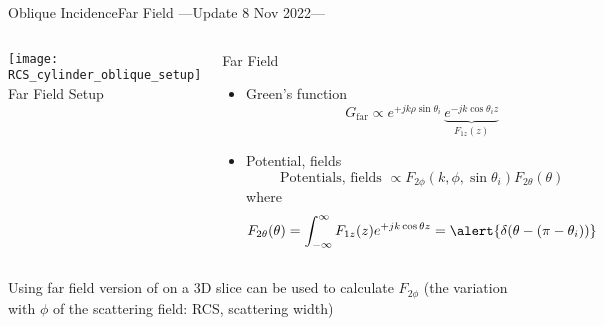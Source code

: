 
\begin{frame}[allowframebreaks]{Oblique Incidence}{Far Field
    ---{Update 8 Nov 2022}---}

  \begin{columns}
     \centering
   \texttt{[image: RCS\_cylinder\_oblique\_setup]}
    \footnotesize{Far Field Setup}

    
     \centering
   \begin{block}{Far Field }
     \begin{itemize}
     \item Green's function
       \begin{equation*}
        G_\text{far} \propto
        e^{+j k \rho \sin\theta_i}\,
        \underbrace{ e^{-j k \cos\theta_i z}}_{F_{1z}(z)}
      \end{equation*}

    \item Potential, fields
      \begin{equation*}
        \text{Potentials, fields } \propto
        F_{2\phi}(k,\phi,\sin\theta_i) F_{2\theta}(\theta)
      \end{equation*}
      where
      \begin{equation*}
        F_{2\theta}(\theta) = \int_{-\infty}^\infty F_{1z}(z)e^{+j k \cos\theta z}
        = \alert{\delta(\theta-(\pi-\theta_i))}
      \end{equation*}
    \end{itemize}
    \end{block}

  \end{columns}

  \vspace{\baselineskip}
  
  \centering\parbox{0.9\linewidth}{\alert{Using far field version of {\GreenD} on a 3D
      slice can be used to calculate $F_{2\phi}$ (the variation
      with $\phi$ of the scattering field: RCS, scattering
      width)} %
  }



\end{frame}
